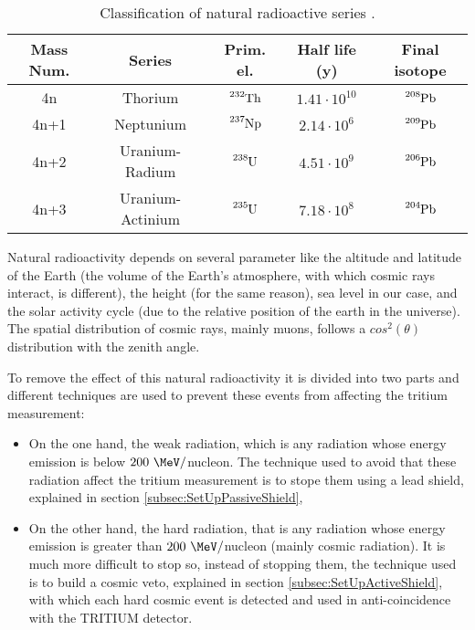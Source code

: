 \begin{table}[htbp]
\begin{center}
\begin{tabular}{|c|c|c|c|c|}
\hline
Mass Num. & Series & Prim. el. & Half life (y) & Final isotope \\
\hline \hline \hline
4n & Thorium & $\ce{^{232}Th}$ & $1.41 \cdot{} 10^{10}$ & $\ce{^{208}Pb}$ \\ \hline
4n+1 & Neptunium & $\ce{^{237}Np}$ & $2.14 \cdot{} 10^{6}$ & $\ce{^{209}Pb}$ \\ \hline
4n+2 & Uranium-Radium & $\ce{^{238}U}$ & $4.51 \cdot{} 10^{9}$ & $\ce{^{206}Pb}$ \\ \hline
4n+3 & Uranium-Actinium & $\ce{^{235}U}$ & $7.18 \cdot{} 10^{8}$ & $\ce{^{204}Pb}$ \\ \hline
\end{tabular}
\caption{Classification of natural radioactive series \cite{NaturalRadioactiveSeries1, NaturalRadioactiveSeries2}.}
\label{tab:NaturalRadioactiveSeries}
\end{center}
\end{table}

Natural radioactivity depends on several parameter like the altitude and latitude of the Earth (the volume of the Earth's atmosphere, with which cosmic rays interact, is different), the height (for the same reason), sea level in our case, and the solar activity cycle (due to the relative position of the earth in the universe). The spatial distribution of cosmic rays, mainly muons, follows a $cos^2(\theta)$ distribution with the zenith angle. %

To remove the effect of this natural radioactivity it is divided into two parts and different techniques are used to prevent these events from affecting the tritium measurement:

\begin{itemize}

\item{}  On the one hand, the weak radiation, which is any radiation whose energy emission is below $200~\MeV/$nucleon. The technique used to avoid that these radiation affect the tritium measurement is to stope them using a lead shield, explained in section \ref{subsec:SetUpPassiveShield},

\item{} On the other hand, the hard radiation, that is any radiation whose energy emission is greater than $200~\MeV/$nucleon (mainly cosmic radiation). It is much more difficult to stop so, instead of stopping them, the technique used is to build a cosmic veto, explained in section \ref{subsec:SetUpActiveShield}, with which each hard cosmic event is detected and used in anti-coincidence with the TRITIUM detector. %

\end{itemize}